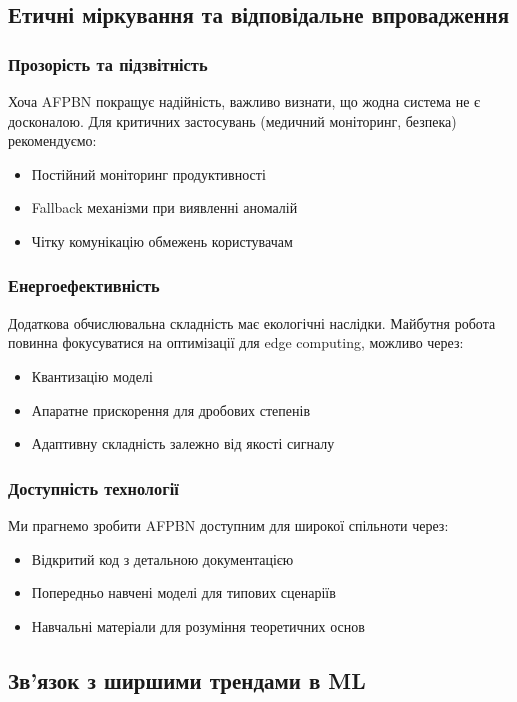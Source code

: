 \documentclass[12pt,a4paper]{article}
\begin{document}
\subsection{Етичні міркування та відповідальне впровадження}

\subsubsection{Прозорість та підзвітність}

Хоча AFPBN покращує надійність, важливо визнати, що жодна система не є досконалою. Для критичних застосувань (медичний моніторинг, безпека) рекомендуємо:
\begin{itemize}
	\item Постійний моніторинг продуктивності
	\item Fallback механізми при виявленні аномалій
	\item Чітку комунікацію обмежень користувачам
\end{itemize}

\subsubsection{Енергоефективність}

Додаткова обчислювальна складність має екологічні наслідки. Майбутня робота повинна фокусуватися на оптимізації для edge computing, можливо через:
\begin{itemize}
	\item Квантизацію моделі
	\item Апаратне прискорення для дробових степенів
	\item Адаптивну складність залежно від якості сигналу
\end{itemize}

\subsubsection{Доступність технології}

Ми прагнемо зробити AFPBN доступним для широкої спільноти через:
\begin{itemize}
	\item Відкритий код з детальною документацією
	\item Попередньо навчені моделі для типових сценаріїв
	\item Навчальні матеріали для розуміння теоретичних основ
\end{itemize}

\subsection{Зв'язок з ширшими трендами в ML}
\end{document}
